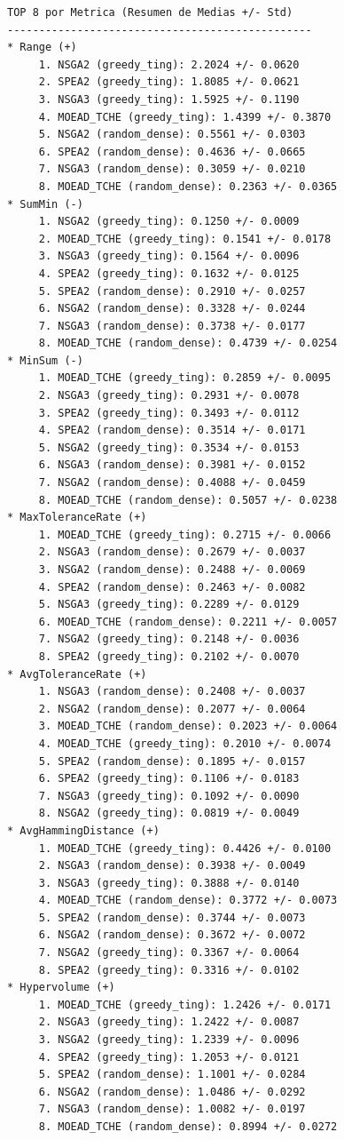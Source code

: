 \documentclass[a4paper,10pt]{article}
\begin{document}
\begin{verbatim}
TOP 8 por Metrica (Resumen de Medias +/- Std)
------------------------------------------------
* Range (+)
     1. NSGA2 (greedy_ting): 2.2024 +/- 0.0620
     2. SPEA2 (greedy_ting): 1.8085 +/- 0.0621
     3. NSGA3 (greedy_ting): 1.5925 +/- 0.1190
     4. MOEAD_TCHE (greedy_ting): 1.4399 +/- 0.3870
     5. NSGA2 (random_dense): 0.5561 +/- 0.0303
     6. SPEA2 (random_dense): 0.4636 +/- 0.0665
     7. NSGA3 (random_dense): 0.3059 +/- 0.0210
     8. MOEAD_TCHE (random_dense): 0.2363 +/- 0.0365
* SumMin (-)
     1. NSGA2 (greedy_ting): 0.1250 +/- 0.0009
     2. MOEAD_TCHE (greedy_ting): 0.1541 +/- 0.0178
     3. NSGA3 (greedy_ting): 0.1564 +/- 0.0096
     4. SPEA2 (greedy_ting): 0.1632 +/- 0.0125
     5. SPEA2 (random_dense): 0.2910 +/- 0.0257
     6. NSGA2 (random_dense): 0.3328 +/- 0.0244
     7. NSGA3 (random_dense): 0.3738 +/- 0.0177
     8. MOEAD_TCHE (random_dense): 0.4739 +/- 0.0254
* MinSum (-)
     1. MOEAD_TCHE (greedy_ting): 0.2859 +/- 0.0095
     2. NSGA3 (greedy_ting): 0.2931 +/- 0.0078
     3. SPEA2 (greedy_ting): 0.3493 +/- 0.0112
     4. SPEA2 (random_dense): 0.3514 +/- 0.0171
     5. NSGA2 (greedy_ting): 0.3534 +/- 0.0153
     6. NSGA3 (random_dense): 0.3981 +/- 0.0152
     7. NSGA2 (random_dense): 0.4088 +/- 0.0459
     8. MOEAD_TCHE (random_dense): 0.5057 +/- 0.0238
* MaxToleranceRate (+)
     1. MOEAD_TCHE (greedy_ting): 0.2715 +/- 0.0066
     2. NSGA3 (random_dense): 0.2679 +/- 0.0037
     3. NSGA2 (random_dense): 0.2488 +/- 0.0069
     4. SPEA2 (random_dense): 0.2463 +/- 0.0082
     5. NSGA3 (greedy_ting): 0.2289 +/- 0.0129
     6. MOEAD_TCHE (random_dense): 0.2211 +/- 0.0057
     7. NSGA2 (greedy_ting): 0.2148 +/- 0.0036
     8. SPEA2 (greedy_ting): 0.2102 +/- 0.0070
* AvgToleranceRate (+)
     1. NSGA3 (random_dense): 0.2408 +/- 0.0037
     2. NSGA2 (random_dense): 0.2077 +/- 0.0064
     3. MOEAD_TCHE (random_dense): 0.2023 +/- 0.0064
     4. MOEAD_TCHE (greedy_ting): 0.2010 +/- 0.0074
     5. SPEA2 (random_dense): 0.1895 +/- 0.0157
     6. SPEA2 (greedy_ting): 0.1106 +/- 0.0183
     7. NSGA3 (greedy_ting): 0.1092 +/- 0.0090
     8. NSGA2 (greedy_ting): 0.0819 +/- 0.0049
* AvgHammingDistance (+)
     1. MOEAD_TCHE (greedy_ting): 0.4426 +/- 0.0100
     2. NSGA3 (random_dense): 0.3938 +/- 0.0049
     3. NSGA3 (greedy_ting): 0.3888 +/- 0.0140
     4. MOEAD_TCHE (random_dense): 0.3772 +/- 0.0073
     5. SPEA2 (random_dense): 0.3744 +/- 0.0073
     6. NSGA2 (random_dense): 0.3672 +/- 0.0072
     7. NSGA2 (greedy_ting): 0.3367 +/- 0.0064
     8. SPEA2 (greedy_ting): 0.3316 +/- 0.0102
* Hypervolume (+)
     1. MOEAD_TCHE (greedy_ting): 1.2426 +/- 0.0171
     2. NSGA3 (greedy_ting): 1.2422 +/- 0.0087
     3. NSGA2 (greedy_ting): 1.2339 +/- 0.0096
     4. SPEA2 (greedy_ting): 1.2053 +/- 0.0121
     5. SPEA2 (random_dense): 1.1001 +/- 0.0284
     6. NSGA2 (random_dense): 1.0486 +/- 0.0292
     7. NSGA3 (random_dense): 1.0082 +/- 0.0197
     8. MOEAD_TCHE (random_dense): 0.8994 +/- 0.0272
\end{verbatim}
\end{document}

